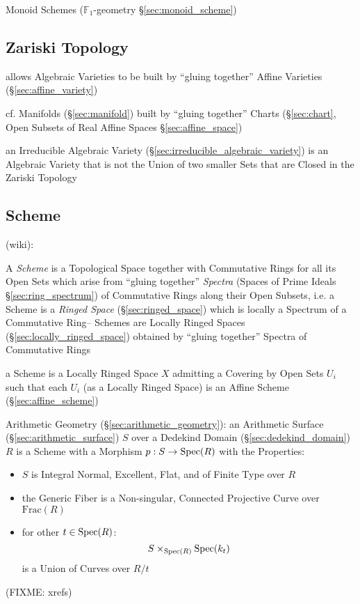 \fist Monoid Schemes ($\mathbb{F}_1$-geometry \S\ref{sec:monoid_scheme})



\subsection{Zariski Topology}\label{sec:zariski_topology}

allows Algebraic Varieties to be built by ``gluing together'' Affine Varieties
 (\S\ref{sec:affine_variety})

cf. Manifolds (\S\ref{sec:manifold}) built by ``gluing together'' Charts
(\S\ref{sec:chart}, Open Subsets of Real Affine Spaces
\S\ref{sec:affine_space})

an Irreducible Algebraic Variety (\S\ref{sec:irreducible_algebraic_variety}) is
an Algebraic Variety that is not the Union of two smaller Sets that are Closed
in the Zariski Topology



\subsection{Scheme}\label{sec:scheme}

(wiki):

A \emph{Scheme} is a Topological Space together with Commutative Rings for all
its Open Sets which arise from ``gluing together'' \emph{Spectra} (Spaces of
Prime Ideals \S\ref{sec:ring_spectrum}) of Commutative Rings along their Open
Subsets, i.e. a Scheme is a \emph{Ringed Space} (\S\ref{sec:ringed_space})
which is locally a Spectrum of a Commutative Ring-- Schemes are Locally Ringed
Spaces (\S\ref{sec:locally_ringed_space}) obtained by ``gluing together''
Spectra of Commutative Rings

a Scheme is a Locally Ringed Space $X$ admitting a Covering by Open Sets $U_i$
such that each $U_i$ (as a Locally Ringed Space) is an Affine Scheme
(\S\ref{sec:affine_scheme})

\asterism

\fist Arithmetic Geometry (\S\ref{sec:arithmetic_geometry}): an Arithmetic
Surface (\S\ref{sec:arithmetic_surface}) $S$ over a Dedekind Domain
(\S\ref{sec:dedekind_domain}) $R$ is a Scheme with a Morphism $p : S \rightarrow
\mathrm{Spec}(R)$ with the Properties:
\begin{itemize}
  \item $S$ is Integral Normal, Excellent, Flat, and of Finite Type over $R$
  \item the Generic Fiber is a Non-singular, Connected Projective Curve over
    $\mathrm{Frac}(R)$
  \item for other $t \in \mathrm{Spec}(R)$:
    \[
      S \times_{\mathrm{Spec}(R)} \mathrm{Spec}(k_t)
    \]
    is a Union of Curves over $R / t$
\end{itemize}
(FIXME: xrefs)

